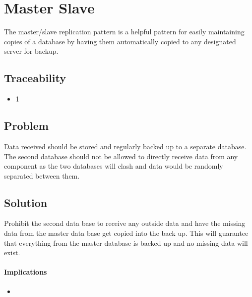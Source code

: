 
\section{Master Slave}

	The master/slave replication pattern is a helpful pattern for easily maintaining copies of a database by having them automatically copied to any designated server for backup.  

	\subsection{Traceability} 
		\begin{itemize}
			\item 1
		\end{itemize}


	\subsection{Problem}

		Data received should be stored and regularly backed up to a separate database. The second database should not be allowed to directly receive data from any component as the two databases will clash and data would be randomly separated between them.

	\subsection{Solution} 

		Prohibit the second data base to receive any outside data and have the missing data from the master data base get copied into the back up. This will guarantee that everything from the master database is backed up and no missing data will exist.


\paragraph{Implications}
\begin{itemize}
	\item
\end{itemize}
